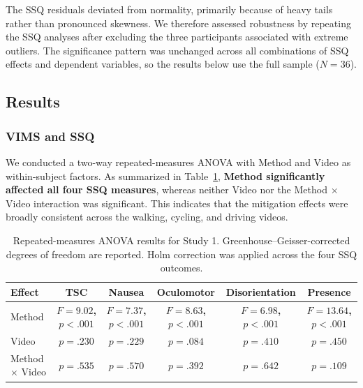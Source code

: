 The SSQ residuals deviated from normality, primarily because of heavy tails rather than pronounced skewness. We therefore assessed robustness by repeating the SSQ analyses after excluding the three participants associated with extreme outliers. The significance pattern was unchanged across all combinations of SSQ effects and dependent variables, so the results below use the full sample ($N=36$).

\subsection{Results}
\label{subsec:study1-results}

\subsubsection{VIMS and SSQ}

We conducted a two-way repeated-measures ANOVA with Method and Video as within-subject factors. As summarized in Table~\ref{tab:study1-anova}, \textbf{Method significantly affected all four SSQ measures}, whereas neither Video nor the Method $\times$ Video interaction was significant. This indicates that the mitigation effects were broadly consistent across the walking, cycling, and driving videos.

\begin{table}[t]
    \centering
    \caption{Repeated-measures ANOVA results for Study 1. Greenhouse--Geisser-corrected degrees of freedom are reported. Holm correction was applied across the four SSQ outcomes.}
    \label{tab:study1-anova}
    \small
    \begin{tabular}{lccccc}
        \toprule
        \textbf{Effect} & \textbf{TSC} & \textbf{Nausea} & \textbf{Oculomotor} & \textbf{Disorientation} & \textbf{Presence} \\
        \midrule

        Method &
        \textbf{$F=9.02$, $p<.001$} &
        \textbf{$F=7.37$, $p<.001$} &
        \textbf{$F=8.63$, $p<.001$} &
        \textbf{$F=6.98$, $p<.001$} &
        \textbf{$F=13.64$, $p<.001$} \\

        Video &
        $p=.230$ &
        $p=.229$ &
        $p=.084$ &
        $p=.410$ &
        $p=.450$ \\

        Method $\times$ Video &
        $p=.535$ &
        $p=.570$ &
        $p=.392$ &
        $p=.642$ &
        $p=.109$ \\

        \bottomrule
    \end{tabular}
\end{table}

